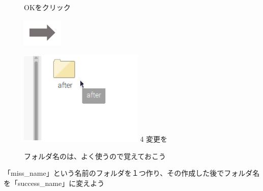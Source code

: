 \documentclass[a4paper,12pt]{jarticle}
\begin{document}
\begin{figure}[ht]
\begin{minipage}{6.973cm}
    OKをクリック
  \end{minipage}
  \includegraphics[width=1.919cm,height=1.365cm]{textbook-img053.png}
  \begin{minipage}{5.751cm}
    \includegraphics[width=5.92cm,height=4.51cm]{textbook-img056.png}
    4 変更を
  \end{minipage}
  \centering

  \begin{minipage}{5.751cm}
    フォルダ名のは、よく使うので覚えておこう
  \end{minipage}
\end{figure}


\theQuestion\label{Q:hasAnswer02-3}

「miss\_name」という名前のフォルダを１つ作り、その作成した後でフォルダ名を「success\_name」に変えよう
\end{document}
